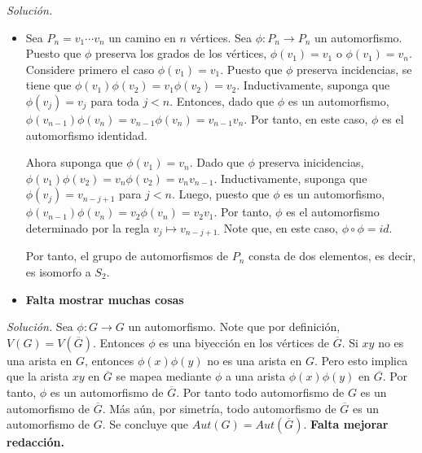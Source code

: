 \documentclass[12pt]{article}
\newenvironment{problem}[2][Problema]{\begin{trivlist}
\item[\hskip \labelsep {\bfseries #1}\hskip \labelsep {\bfseries #2}]}{\end{trivlist}}
\begin{document}
\begin{problem}{1.2.10}

\end{problem}
\textit{Solución.} \begin{itemize}
    \item[a)] Sea $P_n = v_1 \cdots v_n$ un camino en $n$ vértices. Sea $\phi: P_n \rightarrow P_n$ un automorfismo. Puesto que $\phi$ preserva los grados de los vértices, $\phi(v_1) = v_1$ o $\phi(v_1) = v_n.$ Considere primero el caso $\phi(v_1) = v_1.$ Puesto que $\phi$ preserva incidencias, se tiene que $\phi(v_1) \phi(v_2) = v_1 \phi(v_2) = v_2$. Inductivamente, suponga que $\phi(v_j) = v_j$ para toda $j < n.$ Entonces, dado que $\phi$ es un automorfismo, $\phi(v_{n-1})\phi(v_n) = v_{n-1} \phi(v_n) = v_{n-1} v_n.$ Por tanto, en este caso, $\phi$ es el automorfismo identidad.
    
    Ahora suponga que $\phi(v_1) = v_n$. Dado que $\phi$ preserva inicidencias, $\phi(v_1) \phi(v_2) = v_n \phi(v_2) = v_n v_{n-1}$. Inductivamente, suponga que $\phi(v_j) = v_{n-j+1}$ para $j < n.$ Luego, puesto que $\phi$ es un automorfismo, $\phi(v_{n-1})\phi(v_n) = v_2 \phi(v_n) = v_2 v_1$. Por tanto, $\phi$ es el automorfismo determinado por la regla $v_j \mapsto v_{n-j +1.}$ Note que, en este caso, $\phi \circ \phi = id$.
    
    Por tanto, el grupo de automorfismos de $P_n$ consta de dos elementos, es decir, es isomorfo a $S_2.$
    \item[b)] \textbf{Falta mostrar muchas cosas}
\end{itemize}

\begin{problem}{1.2.11}

\end{problem}
\textit{Solución.} Sea $\phi: G \rightarrow G$ un automorfismo. Note que por definición, $V(G) = V(\overline{G}).$ Entonces $\phi$ es una biyección en los vértices de $\overline{G}.$ Si $xy$ no es una arista en $G$, entonces $\phi(x) \phi(y)$ no es una arista en $G.$ Pero esto implica que la arista $xy$ en $\overline{G}$ se mapea mediante $\phi$ a una arista $\phi(x) \phi(y)$ en $\overline{G.}$ Por tanto, $\phi$ es un automorfismo de $\overline{G}$. Por tanto todo automorfismo de $G$ es un automorfismo de $\overline{G}$. Más aún, por simetría, todo automorfismo de $\overline{G}$ es un automorfismo de $G.$ Se concluye que $Aut(G) = Aut(\overline{G}).$ \textbf{Falta mejorar redacción.}
\end{document}
